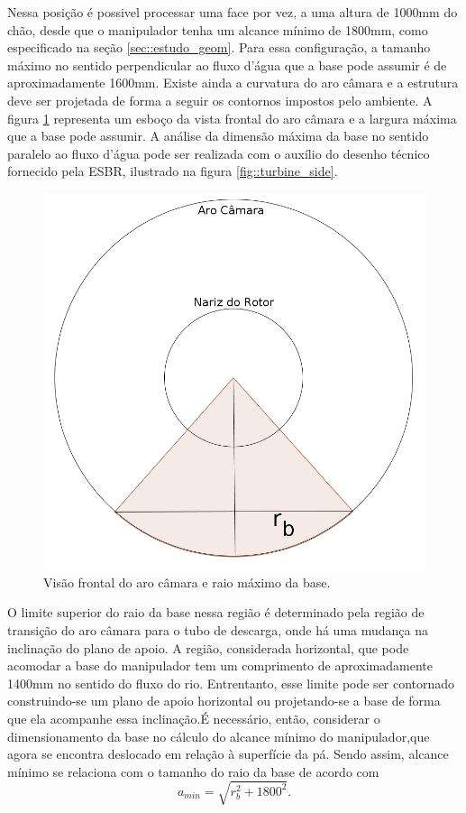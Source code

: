 Nessa posição é possivel processar uma face por
vez, a uma altura de 1000mm do chão, desde que o manipulador tenha um alcance
mínimo de 1800mm, como especificado na seção \ref{sec::estudo_geom}. Para essa
configuração, a tamanho máximo no sentido perpendicular ao fluxo d'água que
a base pode assumir é de aproximadamente 1600mm. Existe ainda a curvatura do aro
câmara e a estrutura deve ser projetada de forma a seguir os
contornos impostos pelo ambiente.
A figura \ref{fig::base_aro_frente} 
representa um esboço da vista frontal do aro câmara e a largura máxima que a
base pode assumir. A análise da dimensão máxima da base no sentido paralelo ao
fluxo d'água pode ser realizada com o auxílio do desenho técnico fornecido pela
ESBR, ilustrado na figura \ref{fig::turbine_side}.

\begin{figure}[h!]
\centering
	\includegraphics[width=\columnwidth]{sota/figs/base/base_aro_frente.jpg}
	\caption{Visão frontal do aro câmara e raio máximo da base.}
	\label{fig::base_aro_frente}
\end{figure}

O limite superior do raio da base nessa
região é determinado pela região de transição do aro câmara para o tubo de
descarga, onde há uma mudança na inclinação do plano de apoio. A região,
considerada horizontal, que pode acomodar a base do manipulador tem um
comprimento de aproximadamente 1400mm no sentido do fluxo do rio.
Entrentanto, esse limite pode ser contornado construindo-se um plano de apoio
horizontal ou projetando-se a base de forma que ela acompanhe essa
inclinação.É necessário, então, considerar o dimensionamento da base no
cálculo do alcance mínimo do manipulador,que agora se encontra deslocado em
relação à superfície da pá. Sendo assim, alcance mínimo se relaciona com o tamanho do raio da base de 
acordo com $$a_{min}=\sqrt{r_b^2+1800^2}.$$

